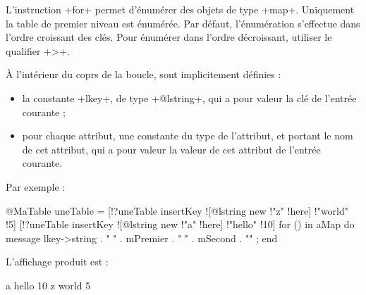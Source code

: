 L'instruction \ggs+for+ permet d'énumérer des objets de type \ggs+map+. Uniquement la table de premier niveau est énumérée. Par défaut, l'énumération s'effectue dans l'ordre croissant des clés. Pour énumérer dans l'ordre décroissant, utiliser le qualifier \ggs+>+.

À l'intérieur du coprs de la boucle, sont implicitement définies :
\begin{itemize}
  \item la constante \ggs+lkey+, de type \ggs+@lstring+, qui a pour valeur la clé de l'entrée courante ;
  \item pour chaque attribut, une constante du type de l'attribut, et portant le nom de cet attribut, qui a pour valeur la valeur de cet attribut de l'entrée courante.
\end{itemize}

Par exemple :
\begin{galgas}
@MaTable uneTable = {}
[!?uneTable insertKey ![@lstring new !"z" !here] !"world" !5]
[!?uneTable insertKey ![@lstring new !"a" !here] !"hello" !10]
for () in aMap do
  message lkey->string . " " . mPremier . " " . mSecond . "\n" ;
end
\end{galgas}

L'affichage produit est :

\begin{galgas}
a hello 10
z world 5
\end{galgas}

